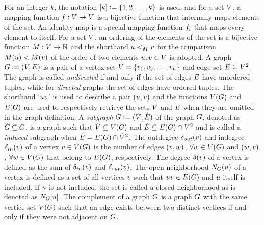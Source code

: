 \documentclass[msc,english,table,xcdraw]{ppgccufmg}
\begin{document}
For an integer $k$, the notation $[k] \vcentcolon= \{1, 2, 
\ldots, k\}$ is used; and for a set $V$, a mapping function $f : V \mapsto V$ is a bijective function that internally maps
elements of the set.
An identity map is a special mapping function $f_{i}$ that maps every element
to itself. 
For a set $V$, an ordering of the elements of the set is a bijective 
function $M : V \mapsto \mathbb{N}$ and the 
shorthand $u <_{M} v$ for the comparison $
M(u) < M(v)$ of the order of 
two elements $u,v\in V$ is adopted.
A graph $G \vcentcolon= (V, E)$ is a pair of a vertex set 
$V = \{v_1, v_2, \ldots, 
v_{n}\}$ and edge set 
$E \subseteq {V^2}$.
The graph is called \textit{undirected} if and only if the set of edges 
$E$ have unordered tuples, while for \textit{directed} graphs the
set of edges have ordered tuples.
The shorthand `$uv$' is used to describe a pair $(u,
v)$ and the functions $V(G)$ and $E(G)$ are used to 
respectively retrieve the sets $V$ and $E$ when they are
omitted in the graph definition.
A \textit{subgraph} $\dot{G} \vcentcolon= (\dot{V}, 
\dot{E})$ of the graph $G$, denoted as $\dot{G} \subseteq 
G$, is a graph such that $\dot{V} \subseteq V(G)$ and
$\dot{E} \subseteq E(G) \cap \dot{V}^{2}$ and is called 
a \textit{induced} subgraph when $\dot{E} = E(G) \cap \dot{V}^{2}$.
The outdegree $\delta_{out}(v)$ and indegree $\delta_{in}(v)$ of a vertex 
$v \in V(G)$ is the number of edges $(v, 
w)$, $\forall w \in V(G)$ and $(w, 
v)$, $\forall w \in V(G)$ that belong to $E(G)$, 
respectively.
The degree $\delta(v)$ of a vertex is defined as the sum of 
$\delta_{in}(v)$ and $\delta_{out}(v)$.
The open neighborhood $N_{G}(u)$ of a vertex is defined 
as a set of all vertices $v$ such that $uv \in E(G)$ and
$u$ itself is included.
If $u$ is not included, the set is called a closed neighborhood as is
denoted as $N_{G}[u]$.
The complement of a graph $G$ is a graph $\dot{G}$ with the same
vertice set $V(G)$ such that an edge exists between two distinct 
vertices if and only if they were not adjacent on $G$.
\end{document}
